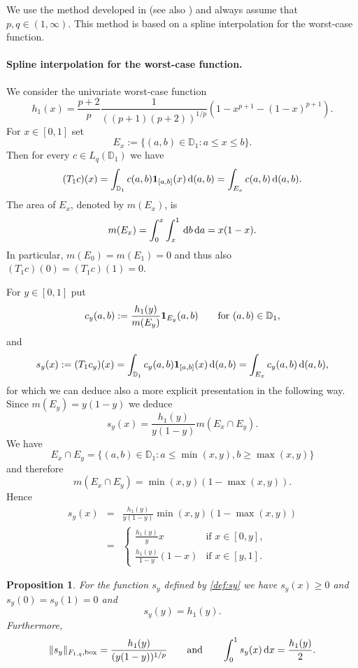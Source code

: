 \documentclass[12pt]{article}
\newtheorem{prop}[thm]{Proposition}
\theoremstyle{remark}
\theoremstyle{definition}
\newcommand{\D}{\mathbb{D}}
\newcommand{\bx}{{\rm box}}
\newcommand{\rd}{\,{\rm d}}
\newcommand{\<}{\langle}
\renewcommand{\>}{\rangle}
\begin{document}
We use the method developed in \cite{NP25} (see also \cite{NP25b}) and always assume that $p,q \in (1, \infty)$.
This method is based on a spline interpolation for the worst-case function.

\paragraph{Spline interpolation for the worst-case function.}

We consider the univariate worst-case function 
\begin{equation}\label{def:h1}
h_1(x)=\frac{p+2}{p} \frac{1}{((p+1)(p+2))^{1/p}} \left(1-x^{p+1}-(1-x)^{p+1}\right).
\end{equation}
For $x \in [0,1]$ set $$E_x:=\{(a,b) \in \D_1 : a \le x \le b\}.$$ Then for every $c \in L_q(\D_1)$ we have $$(T_1c)(x) =\int_{\D_1} c(a,b) {\bf 1}_{[a,b]}(x) \rd (a,b)=\int_{E_x} c(a,b)\rd (a,b).$$ The area of $E_x$, denoted by $m(E_x)$, is $$m(E_x)= \int_0^x \int_x^1 \rd b \rd a = x (1-x).$$ In particular, $m(E_0)=m(E_1)=0$ and thus also $(T_1c)(0)=(T_1c)(1)=0$.

For $y \in [0,1]$ put $$c_y(a,b):=\frac{h_1(y)}{m(E_y)} {\bf 1}_{E_y}(a,b)\qquad \mbox{for $(a,b) \in \D_1$,}$$ and 
\begin{equation}\label{def:sy}
s_y(x):=(T_1 c_y)(x)=\int_{\D_1} c_y(a,b) {\bf 1}_{[a,b]}(x) \rd (a,b)=\int_{E_x} c_y(a,b)\rd (a,b),
\end{equation}
for which we can deduce also a more explicit presentation in the following way. Since $m(E_y)=y(1-y)$ we deduce $$s_y(x)=\frac{h_1(y)}{y (1-y)} m(E_x \cap E_y).$$ We have $$E_x \cap E_y=\{(a,b) \in \D_1 : a \le \min(x,y), b \ge \max(x,y)\}$$ and therefore $$m(E_x \cap E_y)=\min(x,y)(1-\max(x,y)).$$ Hence
\begin{eqnarray}\label{def:syexpl}
s_y(x) & = & \frac{h_1(y)}{y (1-y)}\min(x,y)(1-\max(x,y))\nonumber\\
& = & \left\{ 
\begin{array}{ll}
\frac{h_1(y)}{y} x & \mbox{if } x \in [0,y],\\[0.5em]
\frac{h_1(y)}{1-y}(1-x)  & \mbox{if } x \in [y,1].
\end{array}\right.
\end{eqnarray}



\begin{prop}\label{pr:s:form}
For the function $s_y$ defined by \eqref{def:sy} we have $s_y(x) \ge 0$ and $s_y(0)=s_y(1)=0$ and $$s_y(y)=h_1(y).$$ Furthermore, $$\|s_y\|_{F_{1,q},\bx}=\frac{h_1(y)}{(y(1-y))^{1/p}} \qquad \mbox{and}\qquad \int_0^1 s_y(x) \rd x = \frac{h_1(y)}{2}.$$
\end{prop}
\end{document}
